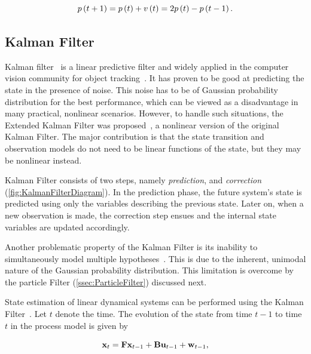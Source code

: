 \begin{equation}
    \label{eq:TrivialMotionModel}
    {p} \left( t + 1 \right) = {p} \left( t \right) + {v} \left( t \right) = 2{p} \left( t \right) - {p} \left( t - 1 \right).
\end{equation}

\subsection{Kalman Filter}
\label{ssec:KalmanFiler}

Kalman filter~\cite{Kalman1960, welch1995introduction} is a linear predictive filter and widely applied in the computer vision community for object tracking~\cite{Jalal2012}. It has proven to be good at predicting the state in the presence of noise. This noise has to be of Gaussian probability distribution for the best performance, which can be viewed as a disadvantage in many practical, nonlinear scenarios. However, to handle such situations, the Extended Kalman Filter was proposed~\cite{welch1995introduction}, a nonlinear version of the original Kalman Filter. The major contribution is that the state transition and observation models do not need to be linear functions of the state, but they may be nonlinear instead.

Kalman Filter consists of two steps, namely \emph{prediction}, and \emph{correction} (\cref{fig:KalmanFilterDiagram}). In the prediction phase, the future system's state is predicted using only the variables describing the previous state. Later on, when a new observation is made, the correction step ensues and the internal state variables are updated accordingly.

Another problematic property of the Kalman Filter is its inability to simultaneously model multiple hypotheses~\cite{welch1995introduction}. This is due to the inherent, unimodal nature of the Gaussian probability distribution. This limitation is overcome by the particle Filter (\cref{ssec:ParticleFilter}) discussed next.

State estimation of linear dynamical systems can be performed using the Kalman Filter~\cite{kim2018introduction}. Let $t$ denote the time. The evolution of the state from time $t - 1$ to time $t$ in the process model is given by

\begin{equation}
    \mathbf{x}_t = \mathbf{F} \mathbf{x}_{t - 1} + \mathbf{B} \mathbf{u}_{t - 1} + \mathbf{w}_{t - 1},
\end{equation}

